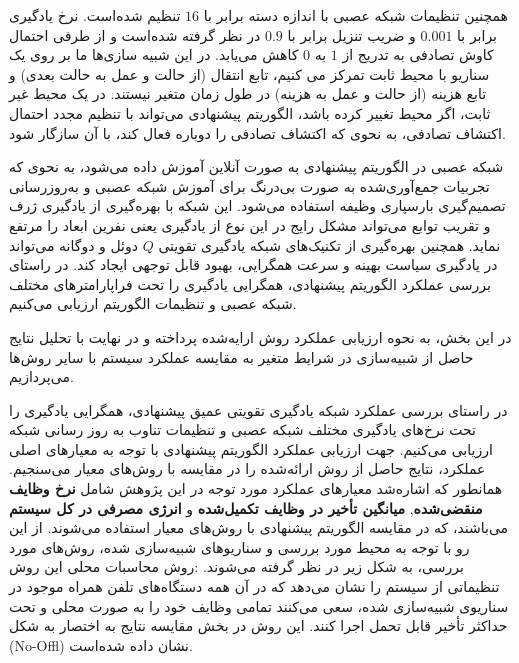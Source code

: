 


همچنین تنظیمات شبکه عصبی با اندازه دسته برابر با $16$ تنظیم شده‌است. نرخ یادگیری برابر با $0.001$ و ضریب تنزیل برابر با $0.9$ در نظر گرفته شده‌است و از طرفی احتمال کاوش تصادفی به تدریج از $1$ به $0$ کاهش می‌یابد. در این شبیه سازی‌ها ما بر روی یک سناریو با محیط ثابت تمرکز می کنیم، تابع انتقال (از حالت و عمل به حالت بعدی) و تابع هزینه (از حالت و عمل به هزینه) در طول زمان متغیر نیستند. در یک محیط غیر ثابت، اگر محیط تغییر کرده باشد، الگوریتم پیشنهادی می‌تواند با تنظیم مجدد احتمال اکتشاف تصادفی، به نحوی که اکتشاف تصادفی را دوباره فعال کند، با آن سازگار شود.







شبکه عصبی در الگوریتم پیشنهادی به صورت آنلاین آموزش داده می‌شود، به نحوی که تجربیات جمع‌آوری‌شده به صورت بی‌درنگ برای آموزش شبکه عصبی و به‌روزرسانی تصمیم‌گیری بارسپاری وظیفه استفاده می‌شود. این شبکه با بهره‌گیری از یادگیری ژرف و تقریب توابع می‌تواند مشکل رایج در این نوع از یادگیری یعنی نفرین ابعاد را مرتفع نماید. همچنین بهره‌گیری از تکنیک‌های شبکه یادگیری تقویتی $Q$ دوئل و دوگانه می‌تواند در یادگیری سیاست بهینه و سرعت همگرایی، بهبود قابل توجهی ایجاد کند. در راستای بررسی عملکرد الگوریتم پیشنهادی، همگرایی یادگیری را تحت فراپارامترهای مختلف شبکه عصبی و تنظیمات الگوریتم ارزیابی می‌کنیم. 









در این بخش، به نحوه ارزیابی عملکرد روش ارايه‌شده پرداخته و در نهایت با تحلیل نتایج حاصل از شبیه‌سازی در شرایط متغیر به مقایسه عملکرد سیستم با سایر روش‌ها می‌پردازیم. 

در راستای بررسی عملکرد شبکه یادگیری تقویتی عمیق پیشنهادی، همگرایی یادگیری را تحت نرخ‌های یادگیری مختلف شبکه عصبی و تنظیمات تناوب به روز رسانی شبکه ارزیابی می‌کنیم. جهت ارزیابی عملکرد الگوریتم پیشنهادی با توجه به معیارهای اصلی عملکرد، نتایج حاصل از روش ارائه‌شده را در مقایسه با روش‌های معیار می‌سنجیم. همانطور که اشاره‌شد معیارهای عملکرد مورد توجه در این پژوهش شامل \textbf{نرخ وظایف منقضی‌شده}, \textbf{میانگین تأخیر در وظایف تکمیل‌شده} و \textbf{انرژی مصرفی در کل سیستم} می‌باشند، که در مقایسه الگوریتم پیشنهادی با روش‌های معیار استفاده می‌شوند. از این رو با توجه به محیط مورد بررسی و سناریوهای شبیه‌سازی شده، روش‌های مورد بررسی، به شکل زیر در نظر گرفته می‌شوند.
 $\textbf{روش محاسبات محلی:}$ این روش تنظیماتی از سیستم را نشان می‌دهد که در آن همه دستگاه‌های تلفن همراه موجود در سناریوی شبیه‌سازی شده، سعی می‌کنند تمامی وظایف خود را به صورت محلی و تحت حداکثر تأخیر قابل تحمل اجرا کنند. این روش در بخش مقایسه نتایج به اختصار به شکل (No-Offl) نشان داده شده‌است. 

